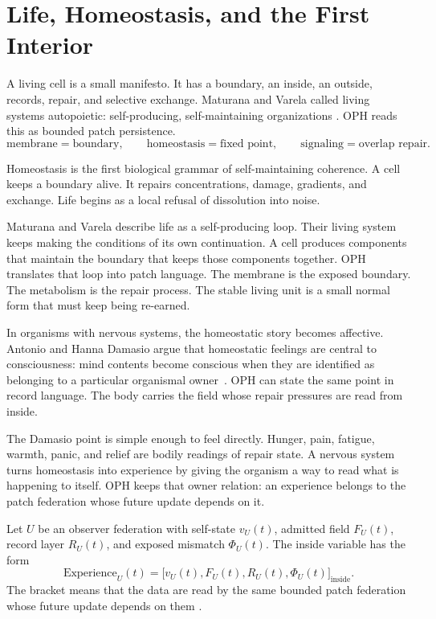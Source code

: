 \documentclass[11pt]{article}
\theoremstyle{remark}
\theoremstyle{plain}
\begin{document}
\section{Life, Homeostasis, and the First Interior}

A living cell is a small manifesto. It has a boundary, an inside, an
outside, records, repair, and selective exchange. Maturana and Varela called
living systems autopoietic: self-producing, self-maintaining organizations
\cite{MaturanaVarela1980}. OPH reads this as bounded patch persistence.
\[
\boxed{
\text{membrane}=\text{boundary}, \qquad
\text{homeostasis}=\text{fixed point}, \qquad
\text{signaling}=\text{overlap repair}.
}
\]

Homeostasis is the first biological grammar of self-maintaining coherence. A
cell keeps a boundary alive. It repairs concentrations, damage, gradients, and
exchange. Life begins as a local refusal of dissolution into noise.

Maturana and Varela describe life as a self-producing loop. Their living system
keeps making the conditions of its own continuation.
A cell produces components that maintain the boundary that keeps those
components together. OPH translates that loop into patch language. The membrane
is the exposed boundary. The metabolism is the repair process. The stable living
unit is a small normal form that must keep being re-earned.

In organisms with nervous systems, the homeostatic story becomes affective.
Antonio and Hanna Damasio argue that homeostatic feelings are central to
consciousness: mind contents become conscious when they are identified as
belonging to a particular organismal owner~\cite{Damasio2023}. OPH can state
the same point in record language. The body carries the field whose repair
pressures are read from inside.

The Damasio point is simple enough to feel directly. Hunger, pain, fatigue,
warmth, panic, and relief are bodily readings of repair state. A nervous system
turns homeostasis into experience by giving the organism a way to read what is
happening to itself. OPH
keeps that owner relation: an experience belongs to the patch federation whose
future update depends on it.

Let \(U\) be an observer federation with self-state \(v_U(t)\), admitted field
\(F_U(t)\), record layer \(R_U(t)\), and exposed mismatch \(\Phi_U(t)\). The
inside variable has the form
\[
\mathrm{Experience}_U(t)=
\bigl[v_U(t),F_U(t),R_U(t),\Phi_U(t)\bigr]_{\mathrm{inside}}.
\]
The bracket means that the data are read by the same bounded patch federation
whose future update depends on them
\cite{OPHThinking,OPHConsciousness}.
\end{document}
